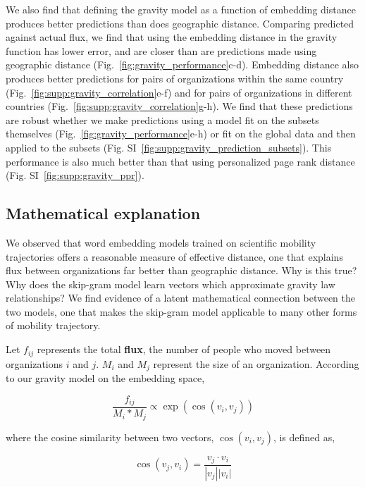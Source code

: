\documentclass[12pt]{article} %
\begin{document}
We also find that defining the gravity model as a function of embedding distance produces better predictions than does geographic distance.
Comparing predicted against actual flux, we find that using the embedding distance in the gravity function has lower error, and are closer than are predictions made using geographic distance (Fig.~\ref{fig:gravity_performance}c-d). 
Embedding distance also produces better predictions for pairs of organizations within the same country (Fig.~\ref{fig:supp:gravity_correlation}e-f) and for pairs of organizations in different countries (Fig.~\ref{fig:supp:gravity_correlation}g-h). 
We find that these predictions are robust whether we make predictions using a model fit on the subsets themselves (Fig.~\ref{fig:gravity_performance}e-h) or fit on the global data and then applied to the subsets (Fig. SI~\ref{fig:supp:gravity_prediction_subsets}). 
This performance is also much better than that using personalized page rank distance (Fig. SI~\ref{fig:supp:gravity_ppr}). 


%
%
\subsection*{Mathematical explanation}

We observed that word embedding models trained on scientific mobility trajectories offers a reasonable measure of effective distance, one that explains flux between organizations far better than geographic distance. 
Why is this true?
Why does the skip-gram model learn vectors which approximate gravity law relationships?
We find evidence of a latent mathematical connection between the two models, one that makes the skip-gram model applicable to many other forms of mobility trajectory. 

Let $f_{ij}$ represents the total \textbf{flux}, the number of people who moved between organizations $i$ and $j$. $M_{i}$ and $M_{j}$ represent the size of an organization. According to our gravity model on the embedding space,

\begin{equation}
    \label{eq:gravity_model}
    \frac{f_{ij}}{M_{i} * M_{j}} \propto \exp(\cos(v_i,v_j))
\end{equation}

where the cosine similarity between two vectors, $\cos(v_{i}, v_{j})$, is defined as,

\begin{equation}
    \cos(v_j, v_i) = \frac{v_j \cdot v_i}{|v_j||v_i|} 
\end{equation}
\end{document}
